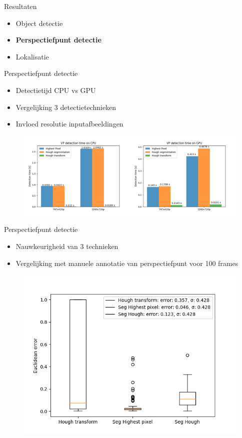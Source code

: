 \documentclass[11pt,t]{beamer}
\begin{document}
%
%
\begin{frame}[fragile]{Resultaten}
	\begin{itemize}
		\item Object detectie
		\item \textbf{Perspectiefpunt detectie}
		\item Lokalisatie
	\end{itemize}
\end{frame}

\begin{frame}[fragile]{Perspectiefpunt detectie}
	\begin{itemize}
		\item Detectietijd CPU vs GPU
		\item Vergelijking 3 detectietechnieken
		\item Invloed resolutie inputafbeeldingen
	\end{itemize}

	\begin{figure}
		\centering
		\includegraphics[width=\linewidth]{graphics/seg_speed.png}
	\end{figure}
\end{frame}

\begin{frame}[fragile]{Perspectiefpunt detectie}
	\begin{itemize}
		\item Nauwkeurigheid van 3 technieken
		\item Vergelijking met manuele annotatie van perspectiefpunt voor 100 frames
	\end{itemize}

	\begin{figure}
		\centering
		\includegraphics[width=0.6\linewidth]{graphics/seg_accuracy.png}
	\end{figure}
\end{frame}
\end{document}
